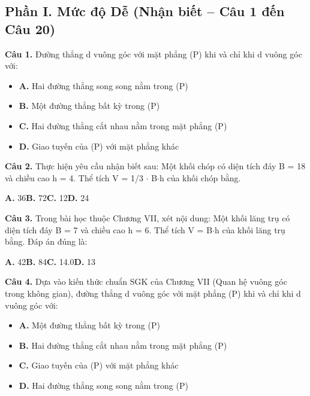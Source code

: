 \documentclass[11pt,a4paper]{article}
\begin{document}
\subsection*{\color{accent} Phần I. Mức độ Dễ (Nhận biết -- Câu 1 đến Câu 20)}
\textbf{\color{primary} Câu 1.} Đường thẳng d vuông góc với mặt phẳng (P) khi và chỉ khi d vuông góc với:\par
\begin{itemize}\setlength{\itemsep}{1pt}\setlength{\parskip}{0pt}
  \item[] \textbf{A.} Hai đường thẳng song song nằm trong (P)
  \item[] \textbf{B.} Một đường thẳng bất kỳ trong (P)
  \item[] \textbf{C.} Hai đường thẳng cắt nhau nằm trong mặt phẳng (P)
  \item[] \textbf{D.} Giao tuyến của (P) với mặt phẳng khác
\end{itemize}\vspace{2pt}
\textbf{\color{primary} Câu 2.} Thực hiện yêu cầu nhận biết sau: Một khối chóp có diện tích đáy B = 18 và chiều cao h = 4. Thể tích V = 1/3 $\cdot$ B$\cdot$h của khối chóp bằng.\par
\hspace*{1.5em}\textbf{A.} 36\quad\quad \textbf{B.} 72\quad\quad \textbf{C.} 12\quad\quad \textbf{D.} 24\par\vspace{2pt}
\textbf{\color{primary} Câu 3.} Trong bài học thuộc Chương VII, xét nội dung: Một khối lăng trụ có diện tích đáy B = 7 và chiều cao h = 6. Thể tích V = B$\cdot$h của khối lăng trụ bằng. Đáp án đúng là:\par
\hspace*{1.5em}\textbf{A.} 42\quad\quad \textbf{B.} 84\quad\quad \textbf{C.} 14.0\quad\quad \textbf{D.} 13\par\vspace{2pt}
\textbf{\color{primary} Câu 4.} Dựa vào kiến thức chuẩn SGK của Chương VII (Quan hệ vuông góc trong không gian), đường thẳng d vuông góc với mặt phẳng (P) khi và chỉ khi d vuông góc với:\par
\begin{itemize}\setlength{\itemsep}{1pt}\setlength{\parskip}{0pt}
  \item[] \textbf{A.} Một đường thẳng bất kỳ trong (P)
  \item[] \textbf{B.} Hai đường thẳng cắt nhau nằm trong mặt phẳng (P)
  \item[] \textbf{C.} Giao tuyến của (P) với mặt phẳng khác
  \item[] \textbf{D.} Hai đường thẳng song song nằm trong (P)
\end{itemize}\vspace{2pt}
\end{document}
